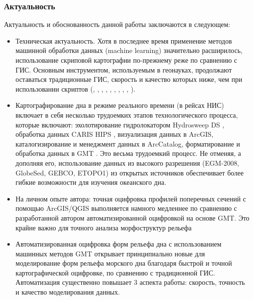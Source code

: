 \documentclass[pdflatex,compress,8pt,
	xcolor={dvipsnames,dvipsnames,svgnames,x11names,table},
	hyperref={colorlinks = true,breaklinks = true, urlcolor = NavyBlue}]{beamer}
\begin{document}
\begin{frame}\frametitle{Актуальность}
Актуальность и обоснованность данной работы заключаются в следующем:

\begin{itemize}\small
         \item Техническая актуальность. Хотя в последнее время применение методов машинной обработки данных (machine learning) значительно расширилось, использование скриповой картографии по-прежнему реже по сравнению с ГИС. Основным инструментом, используемым в геонауках, продолжают оставаться традиционные ГИС, скорость и качество которых ниже, чем при использовании скриптов (\cite{Lemenkova2005b2}, \cite{RID09251802355041}, \cite{RID:0925180235504-2}, \cite{Lemenkova2014d}, \cite{Lemenkova2011c}, \cite{Lemenkova2005a}, \cite{Lemenkova2012j}, \cite{Lemenkova2007c}, \cite{Lemenkova2012d}, \cite{Lemenkova2012g}). 
         \item Картографирование дна в режиме реального времени (в рейсах НИС) включает в себя несколько трудоемких этапов технологического процесса, которые включают: эхолотирование гидролокатором Hydrosweep DS \cite{Lemenkova201569}, обработка данных CARIS HIPS \cite{Lemenkova2007f}, визуализация данных в ArcGIS, каталогизирование и менеджмент данных в ArcCatalog, форматирование и обработка данных в GMT \cite{Lemenkova201565}. Это весьма трудоемкий процесс. Не отменяя, а дополняя его, использование данных из высокого разрешения (EGM-2008, GlobeSed, GEBCO, ETOPO1) из открытых источников обеспечивает более гибкие возможности для изучения океанского дна.
	\item На личном опыте автора: точная оцифровка профилей поперечных сечений с помощью ArcGIS/QGIS выполняется намного медленнее по сравнению с разработанной автором автоматизированной оцифровкой на основе GMT. Это крайне важно для точного анализа морфоструктур рельефа 
	\item Автоматизированная оцифровка форм рельефа дна с использованием машинных методов GMT открывает принципиально новые для моделирование форм рельефа морского дна благодаря быстрой и точной картографической оцифровке, по сравнению с традиционной ГИС. Автоматизация существенно повышает 3 аспекта работы: скорость, точность и качество моделирования данных.
\end{itemize}

\end{frame}
\end{document}
